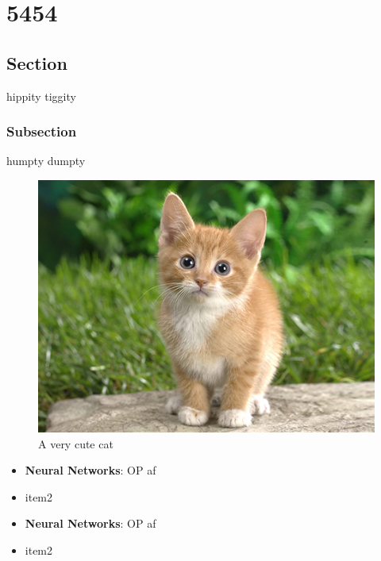 \chapter{5454}
\section{Section}

hippity tiggity

\subsection{Subsection}

humpty dumpty

\begin{figure}[H]
\centering
\includegraphics[width=\textwidth,height=\textheight,keepaspectratio]{../static/media/cutecat.jpg}
\caption{A very cute cat}
\end{figure}

\begin{itemize}
\item \textbf{Neural Networks}: OP af
\item item2

\end{itemize}


\begin{itemize}
\item \textbf{Neural Networks}: OP af
\item item2

\end{itemize}


